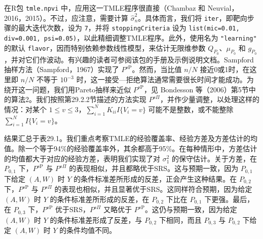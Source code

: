在R包 \texttt{tmle.npvi} 中，应用这一TMLE程序很直接（Chambaz 和 Neuvial，2016，2015）。不过，应注意，需要计算 $\hat\sigma_n^2$。具体而言，我们将 \texttt{iter}，即靶向步骤的最大迭代次数，设为 \texttt{7}，并将 \texttt{stoppingCriteria} 设为 \texttt{list(mic=0.01, div=0.001, psi=0.05)}，以此精细调整TMLE程序。此外，使用名为 \texttt{"learning"} 的默认 \texttt{flavor}，因而特别依赖参数线性模型，来估计无限维参数 $Q_{P_0}$、$\mu_{P_0}$ 和 $g_{P_0}$，并对它们作波动。有兴趣的读者可参阅该包的手册及示例说明文档。Sampford抽样方法（Sampford，1967）实现了 $P^{s\mathrm P}$。然而，当比值 $n/N$ 接近0或1时，在这里即 $n/N$ 不等于 $10^{-3}$ 时，这一接受—拒绝算法通常需要很长时间才能成功。为绕开这一问题，我们用Pareto抽样来近似 $P^{s\mathrm P}$，见 Bondesson 等（2006）第5节中的算法2。我们按照第29.2.2节描述的方法实现 $P^{s\Pi}$，并作少量调整，以处理这样的情况：对某个 $1\le v\le3$，$\sum_{i=1}^NK_{ii}I\{V_i=v\}$ 可能不是整数，或不能整除 $\sum_{i=1}^NI\{V_i=v\}$。

结果汇总于表29.1。我们重点考察TMLE的经验覆盖率、经验方差及方差估计的均值。除一个等于94\%的经验覆盖率外，其余都高于95\%。在每种情形中，方差估计的均值都大于对应的经验方差，表明我们实现了对 $\sigma_1^2$ 的保守估计。关于方差，在 $P_{0,1}$ 下，$P^{s\mathrm P}$ 与 $P^{s\Pi}$ 的表现相似，并且都略优于SRS。这与预期一致，因为 $P_{0,1}$ 下给定 $(A,W)$ 时 $Y$ 的条件标准差所形成的反差，正会产生这种结果。在 $P_{0,2}$ 下，$P^{s\mathrm P}$ 与 $P^{s\Pi}$ 的表现也相似，并且显著优于SRS。这同样符合预期，因为给定 $(A,W)$ 时 $Y$ 的条件标准差所形成的反差，在 $P_{0,2}$ 下比在 $P_{0,1}$ 下更强。最后，在 $P_{0,3}$ 下，$P^{s\mathrm P}$ 优于SRS，$P^{s\Pi}$ 又略优于 $P^{s\mathrm P}$。这仍与预期一致，因为给定 $(A,W)$ 时 $Y$ 的条件标准差形成了反差，与 $P_{0,2}$ 下相同，而且 $P_{0,3}$ 与 $P_{0,2}$ 下给定 $(A,W)$ 时 $Y$ 的条件均值不同。


